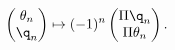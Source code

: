 \begin{equation}
  \begin{pmatrix}
    \theta_n \\
    \q_n
  \end{pmatrix}
 \mapsto
 (-1)^{n}
  \begin{pmatrix}
    \Pi \q_n \\
    \Pi \theta_n
  \end{pmatrix}.
\end{equation}

